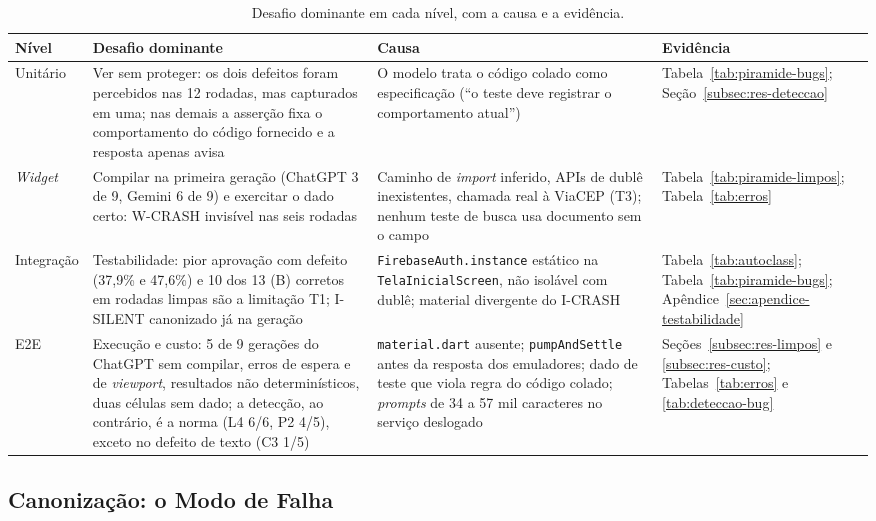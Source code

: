 \documentclass[12pt]{article}
\begin{document}
\begin{table}[H]
\centering
\caption{Desafio dominante em cada nível, com a causa e a evidência.}
\label{tab:desafios}
\small
\setlength{\tabcolsep}{4pt}
\begin{tabular}{P{1.7cm}P{4.1cm}P{4.5cm}P{3.2cm}}
\toprule
\textbf{Nível} & \textbf{Desafio dominante} & \textbf{Causa} & \textbf{Evidência} \\
\midrule
Unitário & Ver sem proteger: os dois defeitos foram percebidos nas 12 rodadas, mas capturados em uma; nas demais a asserção fixa o comportamento do código fornecido e a resposta apenas avisa & O modelo trata o código colado como especificação (``o teste deve registrar o comportamento atual'') & Tabela~\ref{tab:piramide-bugs}; Seção~\ref{subsec:res-deteccao} \\
\addlinespace
\textit{Widget} & Compilar na primeira geração (ChatGPT 3 de 9, Gemini 6 de 9) e exercitar o dado certo: W-CRASH invisível nas seis rodadas & Caminho de \textit{import} inferido, APIs de dublê inexistentes, chamada real à ViaCEP (T3); nenhum teste de busca usa documento sem o campo & Tabela~\ref{tab:piramide-limpos}; Tabela~\ref{tab:erros} \\
\addlinespace
Integração & Testabilidade: pior aprovação com defeito (37,9\% e 47,6\%) e 10 dos 13 (B) corretos em rodadas limpas são a limitação T1; I-SILENT canonizado já na geração & \texttt{FirebaseAuth\allowbreak.instance} estático na \texttt{TelaInicialScreen}, não isolável com dublê; material divergente do I-CRASH & Tabela~\ref{tab:autoclass}; Tabela~\ref{tab:piramide-bugs}; Apêndice~\ref{sec:apendice-testabilidade} \\
\addlinespace
E2E & Execução e custo: 5 de 9 gerações do ChatGPT sem compilar, erros de espera e de \textit{viewport}, resultados não determinísticos, duas células sem dado; a detecção, ao contrário, é a norma (L4 6/6, P2 4/5), exceto no defeito de texto (C3 1/5) & \texttt{material.dart} ausente; \texttt{pumpAndSettle} antes da resposta dos emuladores; dado de teste que viola regra do código colado; \textit{prompts} de 34 a 57 mil caracteres no serviço deslogado & Seções~\ref{subsec:res-limpos} e \ref{subsec:res-custo}; Tabelas~\ref{tab:erros} e \ref{tab:deteccao-bug} \\
\bottomrule
\end{tabular}
\end{table}

\subsection{Canonização: o Modo de Falha}
\label{subsec:disc-canon}
\end{document}
